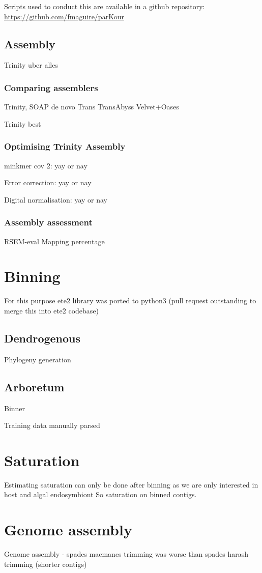 Scripts used to conduct this are available in a github repository:
\url{https://github.com/fmaguire/parKour}



\subsection{Assembly}

Trinity uber alles

\subsubsection{Comparing assemblers}
Trinity,
SOAP de novo Trans
TransAbyss
Velvet+Oases

Trinity best

\subsubsection{Optimising Trinity Assembly}

minkmer cov 2: yay or nay

Error correction: yay or nay

Digital normalisation: yay or nay

\subsubsection{Assembly assessment}
RSEM-eval
Mapping percentage




\section{Binning}
For this purpose ete2 library was ported to python3 (pull request outstanding to merge this into ete2 codebase)
\subsection{Dendrogenous}
Phylogeny generation

\subsection{Arboretum}
Binner 

Training data manually parsed



\section{Saturation}
Estimating saturation can only be done after binning as we are only interested in host and algal endosymbiont
So saturation on binned contigs.



\section{Genome assembly}



Genome assembly - spades macmanes trimming was worse than spades harash trimming (shorter contigs)


